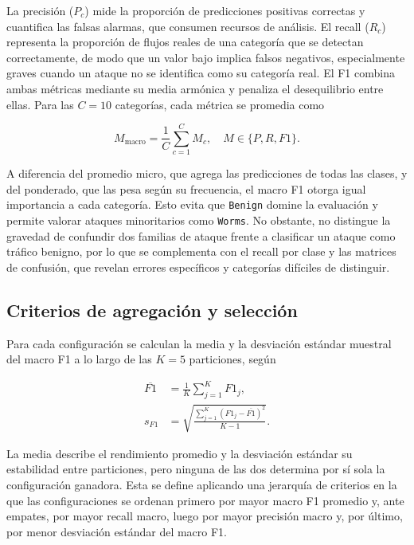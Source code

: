 \documentclass[conference]{IEEEtran}
\begin{document}
La precisión ($P_c$) mide la proporción de predicciones positivas correctas y cuantifica las falsas alarmas, que consumen recursos de análisis. El recall ($R_c$) representa la proporción de flujos reales de una categoría que se detectan correctamente, de modo que un valor bajo implica falsos negativos, especialmente graves cuando un ataque no se identifica como su categoría real. El F1 combina ambas métricas mediante su media armónica y penaliza el desequilibrio entre ellas. Para las $C=10$ categorías, cada métrica se promedia como

\begin{equation}
M_{\mathrm{macro}}=
\frac{1}{C}\sum_{c=1}^{C}M_c,
\quad M\in\{P,R,F1\}.
\end{equation}

A diferencia del promedio micro, que agrega las predicciones de todas las clases, y del ponderado, que las pesa según su frecuencia, el macro F1 otorga igual importancia a cada categoría. Esto evita que \texttt{Benign} domine la evaluación y permite valorar ataques minoritarios como \texttt{Worms}. No obstante, no distingue la gravedad de confundir dos familias de ataque frente a clasificar un ataque como tráfico benigno, por lo que se complementa con el recall por clase y las matrices de confusión, que revelan errores específicos y categorías difíciles de distinguir.

\subsection{Criterios de agregación y selección}

Para cada configuración se calculan la media y la desviación estándar muestral del macro F1 a lo largo de las $K=5$ particiones, según

\begin{equation}
\begin{aligned}
\overline{F1} &= \frac{1}{K}
\sum_{j=1}^{K}F1_j,\\
s_{F1} &= \sqrt{
\frac{\sum_{j=1}^{K}(F1_j-\overline{F1})^2}
{K-1}}.
\end{aligned}
\end{equation}

La media describe el rendimiento promedio y la desviación estándar su estabilidad entre particiones, pero ninguna de las dos determina por sí sola la configuración ganadora. Esta se define aplicando una jerarquía de criterios en la que las configuraciones se ordenan primero por mayor macro F1 promedio y, ante empates, por mayor recall macro, luego por mayor precisión macro y, por último, por menor desviación estándar del macro F1.
\end{document}
